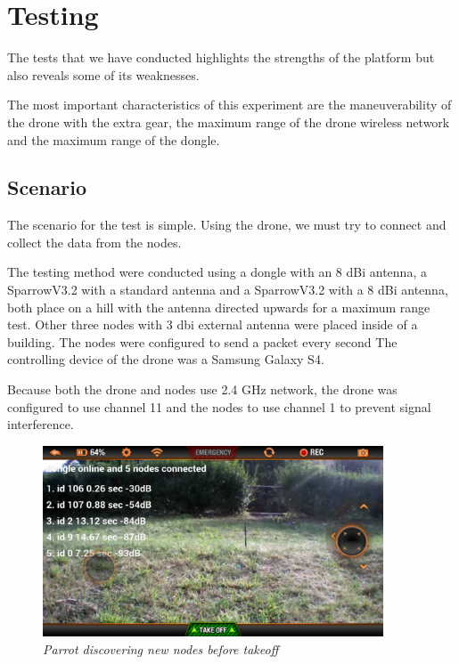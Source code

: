 \normalfont\normalsize
\chapter{Testing}

The tests that we have conducted highlights the strengths of the platform but also reveals some of its weaknesses.

The most important characteristics of this experiment are the maneuverability of the drone with the extra gear, the maximum range of the drone wireless network and the maximum range of the dongle.



\section{Scenario}

The scenario for the test is simple. Using the drone, we must try to connect and collect the data from the nodes.

The testing method were conducted using a dongle with an 8 dBi antenna, a SparrowV3.2  with a standard antenna and a SparrowV3.2 with a 8 dBi antenna, both place on a hill with the antenna directed upwards for a maximum range test. Other  three nodes with 3 dbi external antenna were placed inside of a building. The nodes were configured to send a packet every second The controlling device of the drone was a Samsung Galaxy S4.

Because both the drone and nodes use 2.4 GHz network, the drone was configured to use channel 11 and the nodes to use channel 1 to prevent signal interference.

\begin{figure}[ht]
\begin{center}
\includegraphics[width=0.9\textwidth]{img/parrot_test.png}
\end{center}
\caption{\small \itshape{Parrot discovering new nodes before takeoff}}
\end{figure}


